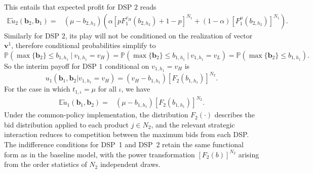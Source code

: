 \documentclass[11pt]{article}
\theoremstyle{plain}
\theoremstyle{definition}
\theoremstyle{plain}
\theoremstyle{plain}
\theoremstyle{plain}
\theoremstyle{plain}
\numberwithin{equation}{section}
\begin{document}
\noindent This entails that expected profit for DSP $2$ reads
\begin{align*}
\mathbb{E} \tilde{u}_2 (\bm{b}_2, \bm{b}_1) = & \left(\mu - b_{2, h_2} \right) \left( \alpha \left[pF_1^{v_H}(b_{2,h_2}) + 1-p \right]^{N_1} + (1-\alpha) \left[F_1^{\mu}(b_{2,h_2})\right]^{N_1} \right).
\end{align*}
Similarly for DSP $2$, its play will not be conditioned on the realization of vector $\bm{v}^1$, therefore conditional probabilities simplify to
\begin{equation*}
    \mathbb{P}(\max \{ \bm{b}_2 \} \leq b_{1, h_1} \ | \ v_{1,h_1} = v_H) = \mathbb{P}(\max \{ \bm{b}_2 \} \leq b_{1, h_1} \ | \ v_{1,h_1} = v_L) = \mathbb{P}(\max \{ \bm{b}_2 \} \leq b_{1, h_1}).
\end{equation*}
So the interim payoff for DSP $1$ conditional on $v_{1,h_1} = v_H$ is
\begin{equation*}
    u_1(\bm{b}_1, \bm{b}_2 | v_{1,h_1} = v_H) = \left( v_H - b_{1,h_1} \right) \left[F_2(b_{1,h_1})\right]^{N_2}.
\end{equation*}
For the case in which $t_{1,\iota} = \mu$ for all $\iota$, we have
\begin{align*}
\mathbb{E} \tilde{u}_1 (\bm{b}_1, \bm{b}_2) = & (\mu - b_{1, h_1})\left[F_2(b_{1,h_1})\right]^{N_2}.
\end{align*}
Under the common-policy implementation, the distribution $F_2(\cdot)$ describes the bid distribution applied to each product $j \in N_2$, and the relevant strategic interaction reduces to competition between the maximum bids from each DSP. The indifference conditions for DSP~1 and DSP~2 retain the same functional form as in the baseline model, with the power transformation $[F_2(b)]^{N_2}$ arising from the order statistics of $N_2$ independent draws.

\vspace{0.4cm}
\end{document}
